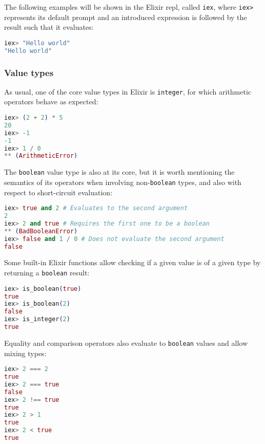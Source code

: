 The following examples will be shown in the Elixir \gls{repl}, called
\verb|iex|, where \verb|iex>| represents its default prompt and an introduced
expression is followed by the result such that it evaluates:

\begin{lstlisting}[language=elixir,numbers=none,frame=none]
iex> "Hello world"
"Hello world"
\end{lstlisting}

\subsubsection{Value types}

As usual, one of the core value types in Elixir is \verb|integer|, for which
arithmetic operators behave as expected:

\begin{lstlisting}[language=elixir,numbers=none,frame=none]
iex> (2 + 2) * 5
20
iex> -1
-1
iex> 1 / 0
** (ArithmeticError)
\end{lstlisting}

The \verb|boolean| value type is also at its core, but it is worth mentioning
the semantics of its operators when involving non-\verb|boolean| types, and also
with respect to short-circuit evaluation:

\begin{lstlisting}[language=elixir,numbers=none,frame=none]
iex> true and 2 # Evaluates to the second argument
2
iex> 2 and true # Requires the first one to be a boolean
** (BadBooleanError)
iex> false and 1 / 0 # Does not evaluate the second argument
false
\end{lstlisting}

Some built-in Elixir functions allow checking if a given value is of a given
type by returning a \verb|boolean| result:

\begin{lstlisting}[language=elixir,numbers=none,frame=none]
iex> is_boolean(true)
true
iex> is_boolean(2)
false
iex> is_integer(2)
true
\end{lstlisting}

Equality and comparison operators also evaluate to \verb|boolean| values and
allow mixing types:

\begin{lstlisting}[language=elixir,numbers=none,frame=none]
iex> 2 === 2
true
iex> 2 === true
false
iex> 2 !== true
true
iex> 2 > 1
true
iex> 2 < true
true
\end{lstlisting}

